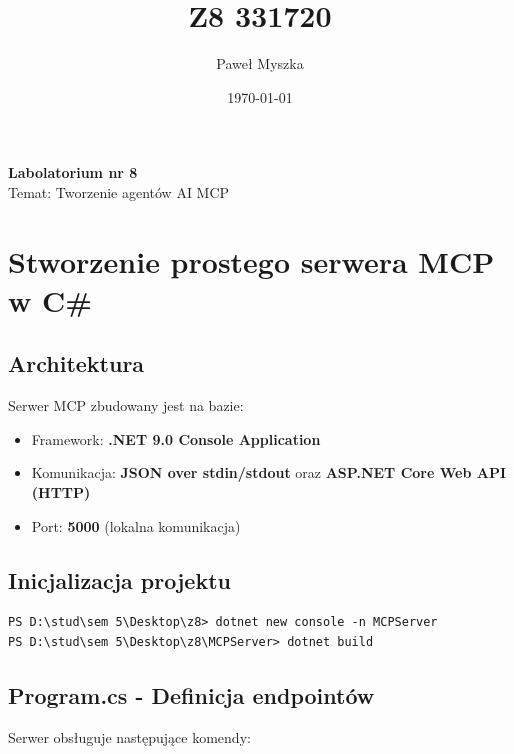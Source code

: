 \documentclass[twoside]{article}
\title{Z8 331720}
\author{Paweł Myszka}
\date{\today}
\begin{document}
	
	\pagestyle{fancy}
	\fancyhead{}
	\fancyhead[L]{\@title}
	\fancyhead[R]{\@author}
	\fancyhead[C]{\@date}
	
	\cfoot{\thepage\ / \pageref{LastPage}}
	
	\newpage
	\begin{center}
		{\Huge \textbf{Labolatorium nr 8}}\\[0.5cm]
		{\Large Temat: Tworzenie agentów AI MCP}
	\end{center}
	
	\newpage

\section{Stworzenie prostego serwera MCP w C\#}

\subsection{Architektura}

Serwer MCP zbudowany jest na bazie:
\begin{itemize}
	\item Framework: \textbf{.NET 9.0 Console Application}
	\item Komunikacja: \textbf{JSON over stdin/stdout} oraz \textbf{ASP.NET Core Web API (HTTP)}
	\item Port: \textbf{5000} (lokalna komunikacja)
\end{itemize}

\subsection{Inicjalizacja projektu}

\begin{verbatim}
PS D:\stud\sem 5\Desktop\z8> dotnet new console -n MCPServer
PS D:\stud\sem 5\Desktop\z8\MCPServer> dotnet build
\end{verbatim}

\subsection{Program.cs - Definicja endpointów}

Serwer obsługuje następujące komendy:
\end{document}
